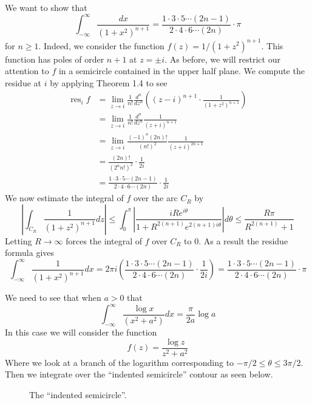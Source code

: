 \documentclass{article}
\newcommand{\exercise}[1]{\noindent{\textbf{Exercise #1:}}}
\newcommand{\res}{\operatorname{res}}
\begin{document}
\exercise{3.8.6}

We want to show that
\[
\int_{-\infty}^\infty \frac{dx}{(1+x^2)^{n+1}} = \frac{1\cdot 3\cdot
  5\cdots (2n-1)}{2\cdot 4\cdot 6\cdots (2n)}\cdot\pi
\]
for $n \geq 1$. Indeed, we consider the function $f(z) =
1/(1+z^2)^{n+1}$. This function has poles of order $n+1$ at $z = \pm
i$. As before, we will restrict our attention to $f$ in a semicircle
contained in the upper half plane. We compute the residue at $i$ by
applying Theorem 1.4 to see
\begin{align*}
  \res_i f &= \lim_{z\to i} \frac{1}{n!}\frac{d^n}{dz^n}
  \left((z-i)^{n+1}\cdot
    \frac{1}{(1+z^2)^{n+1}}\right) \\
  &= \lim_{z\to i} \frac{1}{n!}\frac{d^n}{dz^n}\frac{1}{(z+i)^{n+1}} \\
  &= \lim_{z\to i} \frac{(-1)^n(2n)!}{(n!)^2}\frac{1}{(z+i)^{2n+1}} \\
  &= \frac{(2n)!}{(2^nn!)^2}\cdot\frac{1}{2i} \\
  &= \frac{1\cdot 3\cdot 5\cdots (2n-1)}{2\cdot 4\cdot 6 \cdots
    (2n)}\cdot\frac {1}{2i}
\end{align*}
We now estimate the integral of $f$ over the arc $C_R$ by
\[
\left|\int_{C_R} \frac{1}{(1+z^2)^{n+1}}dz\right| \leq
\int_0^\pi\left|\frac{iRe^{i\theta}}
  {1+R^{2(n+1)}e^{2(n+1)i\theta}}\right|d\theta \leq \frac{R\pi}{R^{2(n+1)}+1}
\]
Letting $R\to\infty$ forces the integral of $f$ over $C_R$ to 0. As a
result the residue formula gives
\[
\int_{-\infty}^\infty \frac{1}{(1+x^2)^{n+1}}dx = 2\pi
i\left(\frac{1\cdot 3\cdot 5\cdots (2n-1)}{2\cdot 4\cdot 6 \cdots
    (2n)}\cdot\frac {1}{2i}\right) = \frac{1\cdot 3\cdot 5\cdots
  (2n-1)}{2\cdot 4\cdot 6 \cdots (2n)}\cdot \pi
\]

\exercise{3.8.10}

We need to see that when $a > 0$ that
\[
\int_{-\infty}^\infty \frac{\log x}{(x^2+a^2)}dx = \frac{\pi}{2a}\log a
\]
In this case we will consider the function
\[
f(z) = \frac{\log z}{z^2+a^2}
\]
Where we look at a branch of the logarithm corresponding to $-\pi/2 \leq
\theta \leq 3\pi/2$. Then we integrate over the ``indented semicircle''
contour as seen below.
\begin{figure}[]
  \centering
  \caption{The ``indented semicircle''.}
\end{figure}
\end{document}
